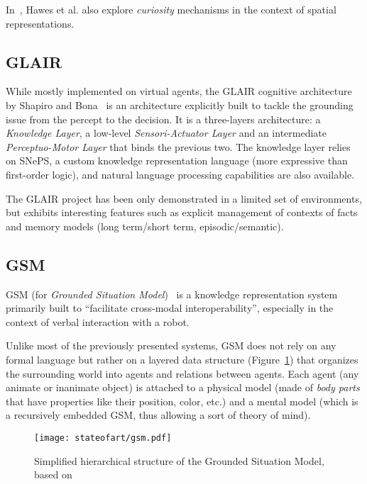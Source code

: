 In~\cite{Hawes2011}, Hawes et al. also explore \emph{curiosity} mechanisms in
the context of spatial representations.

\subsection{GLAIR}
\label{sect|glair}


While mostly implemented on virtual agents, the GLAIR cognitive architecture by
Shapiro and Bona~\cite{Shapiro2009} is an architecture explicitly built to
tackle the grounding issue from the percept to the decision. It is a
three-layers architecture: a \emph{Knowledge Layer}, a low-level
\emph{Sensori-Actuator Layer} and an intermediate \emph{Perceptuo-Motor Layer}
that binds the previous two.  The knowledge layer relies on SNePS, a custom
knowledge representation language (more expressive than first-order logic), and
natural language processing capabilities are also available.

The GLAIR project has been only demonstrated in a limited set of
environments, but exhibits interesting features such as explicit management
of contexts of facts and memory models (long term/short term,
episodic/semantic).


\subsection{GSM}
\label{sect|gsm}

GSM (for \emph{Grounded Situation Model})~\cite{Mavridis2006} is a knowledge
representation system primarily built to ``facilitate cross-modal
interoperability'',  especially in the context of verbal interaction with a
robot.

Unlike most of the previously presented systems, GSM does not rely on any
formal language but rather on a layered data structure (Figure~\ref{fig|gsm})
that organizes the surrounding world into agents and relations between agents.
Each agent (any animate or inanimate object) is attached to a physical model (made
of \emph{body parts} that have properties like their position, color, etc.) and
a mental model (which is a recursively embedded GSM, thus allowing a sort of
theory of mind).

\begin{figure}
    \centering
    \texttt{[image: stateofart/gsm.pdf]}

    \caption{Simplified hierarchical structure of the Grounded Situation Model,
    based on~\cite{Mavridis2006}}

    \label{fig|gsm}
\end{figure}

